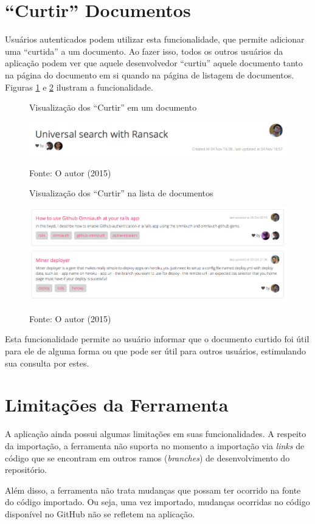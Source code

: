 \section{``Curtir'' Documentos}

Usuários autenticados podem utilizar esta funcionalidade, que permite adicionar uma ``curtida'' a um documento. Ao fazer isso, todos os outros usuários da aplicação podem ver que aquele desenvolvedor ``curtiu'' aquele documento tanto na página do documento em si quando na página de listagem de documentos. Figuras \ref{fig:doc-like-1} e \ref{fig:doc-like-2} ilustram a funcionalidade.

\begin{figure}[ht]
	\centering
    \caption{Visualização dos ``Curtir'' em um documento}
    \includegraphics[width=15cm]{Imagens/print-like-1.png}
		\label{fig:doc-like-1}
	\caption*{Fonte: O autor (2015)}
\end{figure}

\begin{figure}[ht]
	\centering
    \caption{Visualização dos ``Curtir'' na lista de documentos}
    \includegraphics[width=15cm]{Imagens/print-like-2.png}
		\label{fig:doc-like-2}
	\caption*{Fonte: O autor (2015)}
\end{figure}

\clearpage

Esta funcionalidade permite ao usuário informar que o documento curtido foi útil para ele de alguma forma ou que pode ser útil para outros usuários, estimulando sua consulta por estes.

\section{Limitações da Ferramenta}

A aplicação ainda possui algumas limitações em suas funcionalidades. A respeito da importação, a ferramenta não suporta no momento a importação via \textit{links} de código que se encontram em outros ramos (\textit{branches}) de desenvolvimento do repositório.

Além disso, a ferramenta não trata mudanças que possam ter ocorrido na fonte do código importado. Ou seja, uma vez importado, mudanças ocorridas no código disponível no GitHub não se refletem na aplicação.

